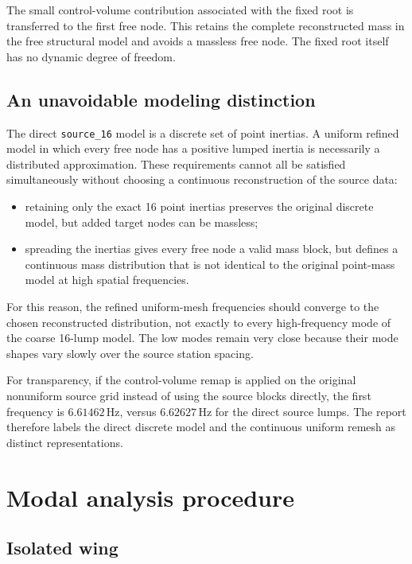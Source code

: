 \documentclass[11pt,a4paper]{article}
\newcommand{\Hz}{\,\mathrm{Hz}}
\begin{document}
The small control-volume contribution associated with the fixed root is
transferred to the first free node.  This retains the complete reconstructed
mass in the free structural model and avoids a massless free node.  The fixed
root itself has no dynamic degree of freedom.

\subsection{An unavoidable modeling distinction}

The direct \texttt{source\_16} model is a discrete set of point inertias.  A
uniform refined model in which every free node has a positive lumped inertia
is necessarily a distributed approximation.  These requirements cannot all
be satisfied simultaneously without choosing a continuous reconstruction of
the source data:
\begin{itemize}
  \item retaining only the exact 16 point inertias preserves the original
        discrete model, but added target nodes can be massless;
  \item spreading the inertias gives every free node a valid mass block, but
        defines a continuous mass distribution that is not identical to the
        original point-mass model at high spatial frequencies.
\end{itemize}

For this reason, the refined uniform-mesh frequencies should converge to the
chosen reconstructed distribution, not exactly to every high-frequency mode
of the coarse 16-lump model.  The low modes remain very close because their
mode shapes vary slowly over the source station spacing.

For transparency, if the control-volume remap is applied on the original
nonuniform source grid instead of using the source blocks directly, the first
frequency is \(6.61462\Hz\), versus \(6.62627\Hz\) for the direct source
lumps.  The report therefore labels the direct discrete model and the
continuous uniform remesh as distinct representations.

\section{Modal analysis procedure}

\subsection{Isolated wing}
\end{document}
